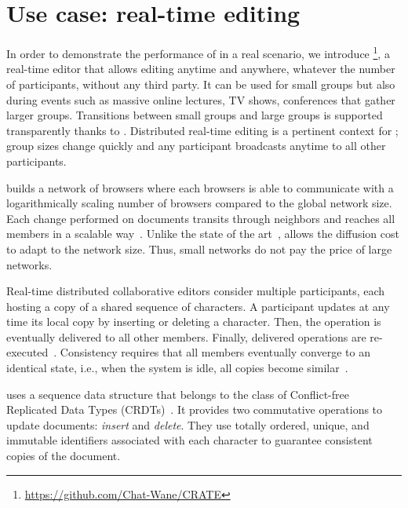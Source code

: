 
\section{Use case: real-time editing}
\label{sec:use-case}

In order to demonstrate the performance of \SPRAY in a real scenario,
we introduce \CRATE \footnote{\url{https://github.com/Chat-Wane/CRATE}}, a real-time editor that allows editing anytime
and anywhere, whatever the number of participants, without any third
party. It can be used for small groups but also during events such as
massive online lectures, TV shows, conferences that gather larger
groups. Transitions between small groups and large groups is supported
transparently thanks to \SPRAY. Distributed real-time editing is a
pertinent context for \SPRAY; group sizes change quickly and any
participant broadcasts anytime to all other participants.

\CRATE builds a network of browsers where each browsers is able to
communicate with a logarithmically scaling number of browsers compared
to the global network size. Each change performed on documents
transits through neighbors and reaches all members in a scalable
way~\cite{birman1999bimodal}. Unlike the state of the
art~\cite{tolgyeski2009adaptive, voulgaris2005cyclon}, \SPRAY allows
the diffusion cost to adapt to the network size. Thus, small networks
do not pay the price of large networks.

Real-time distributed collaborative editors consider multiple participants, each
hosting a copy of a shared sequence of characters. A participant updates at any
time its local copy by inserting or deleting a character. Then, the operation is
eventually delivered to all other members. Finally, delivered operations are
re-executed~\cite{saito2005optimistic}. Consistency requires that all members
eventually converge to an identical state, i.e., when the system is idle, all
copies become similar~\cite{bailis2013eventual}.

\CRATE uses a sequence data structure that belongs to the class of Conflict-free
Replicated Data Types (CRDTs)~\cite{shapiro2011conflict,
  shapiro2011comprehensive}. It provides two commutative operations to update
documents: \emph{insert} and \emph{delete}.  They use totally ordered, unique,
and immutable identifiers associated with each character to guarantee consistent
copies of the document. %

